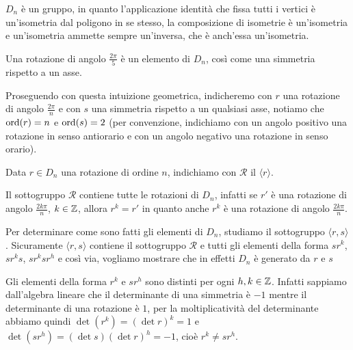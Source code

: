 \documentclass[11pt]{scrartcl}
\begin{document}
\begin{remark}
    $D_n$ è un gruppo, in quanto l'applicazione identità che 
    fissa tutti i vertici è un'isometria dal poligono in se stesso, la 
    composizione di isometrie è un'isometria e un'isometria ammette sempre 
    un'inversa, che è anch'essa un'isometria.
\end{remark}

\begin{remark}
    Una rotazione di angolo $\displaystyle\frac{2\pi}{5}$ è un elemento di $D_n$,
    così come una simmetria rispetto a un asse.
\end{remark}

Proseguendo con questa intuizione geometrica, indicheremo con $r$ una rotazione
di angolo $\displaystyle \frac{2\pi}{n}$ e con $s$ una simmetria rispetto a
un qualsiasi asse, notiamo che $\operatorname{ord}(r) = n$ e $\operatorname{ord}(s) = 2$ (per convenzione, 
indichiamo con un angolo positivo una rotazione in senso antiorario e con un 
angolo negativo una rotazione in senso orario).

\begin{definition}
    Data $r \in D_n$ una rotazione di ordine $n$, indichiamo con $\mathcal{R}$ il
     $\langle r\rangle$.
\end{definition}

\begin{remark}
    Il sottogruppo $\mathcal{R}$ contiene tutte le rotazioni di $D_n$, infatti
    se $r'$ è una rotazione di angolo $\displaystyle\frac{2k\pi}{n}$, $k \in \mathbb Z$,
    allora $r^k = r'$ in quanto anche $r^k$ è una rotazione di angolo 
    $\displaystyle\frac{2k\pi}{n}$.
\end{remark}

Per determinare come sono fatti gli elementi di $D_n$, studiamo il sottogruppo
$\langle r, s\rangle$. Sicuramente $\langle r, s\rangle$ contiene il sottogruppo $\mathcal{R}$
e tutti gli elementi della forma $sr^k$, $sr^ks$, $sr^ksr^h$ e così via, vogliamo
mostrare che in effetti $D_n$ è generato da $r$ e $s$

\begin{remark}
    Gli elementi della forma $r^k$ e $sr^h$ sono distinti per ogni $h, k \in \mathbb Z$. 
    Infatti sappiamo dall'algebra lineare che il determinante di una simmetria
    è $-1$ mentre il determinante di una rotazione è $1$, per la moltiplicatività
    del determinante abbiamo quindi $\det (r^k) = (\det r)^k = 1$ e
    $\det (sr^h) = (\det s)(\det r)^h = -1$, cioè $r^k \neq sr^h$.
\end{remark}
\end{document}

